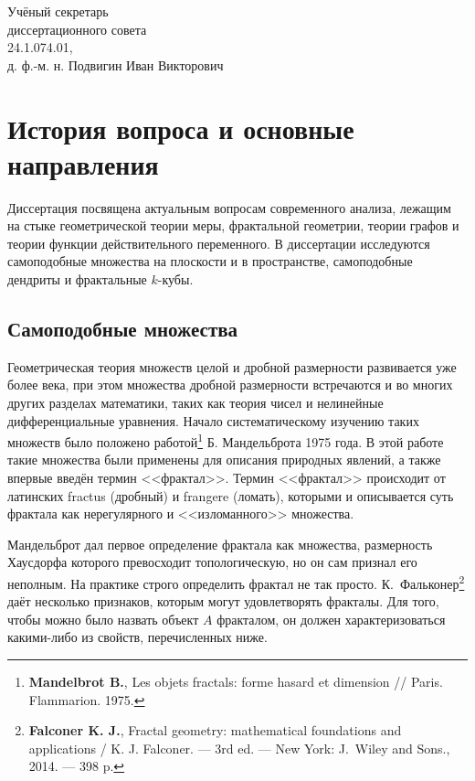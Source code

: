 \documentclass[a5paper,9pt,twoside]{extarticle} %
\begin{document}
\vspace{0.008\paperheight plus1fill}


\vspace{0.008\paperheight plus1fill}
\noindent
Учёный секретарь\\
диссертационного совета\\
24.1.074.01,\\
д. ф.-м. н. \hfill Подвигин Иван Викторович

\newpage

\section{История вопроса и основные направления}

Диссертация посвящена актуальным вопросам современного анализа, лежащим на стыке геометрической теории меры, фрактальной геометрии, теории графов и теории функции действительного переменного.
В диссертации исследуются самоподобные множества на плоскости и в пространстве, самоподобные дендриты и фрактальные $k$-кубы.

\subsection{Самоподобные множества}

Геометрическая теория множеств целой и дробной размерности развивается уже более века, при этом множества дробной размерности встречаются и во многих других разделах математики, таких как теория чисел и нелинейные дифференциальные уравнения.
Начало систематическому изучению таких множеств было положено работой\footnote{{\bf Mandelbrot B.}, Les objets fractals: forme hasard et dimension // Paris. Flammarion. 1975.} Б. Мандельброта 1975 года.
В этой работе такие множества были применены для описания природных явлений, а также впервые введён термин <<фрактал>>.
Термин <<фрактал>> происходит от латинских fractus (дробный) и frangere (ломать), которыми и описывается суть фрактала как нерегулярного и <<изломанного>> множества.

Мандельброт дал первое определение фрактала как множества, размерность Хаусдорфа которого превосходит топологическую, но он сам признал его неполным.
На практике строго определить фрактал не так просто.
К.~Фальконер\footnote{{\bf Falconer K. J.}, Fractal geometry: mathematical foundations and applications / K. J. Falconer. --- 3rd ed. --- New York: J.~Wiley and Sons., 2014. --- 398 p.} даёт несколько признаков, которым могут удовлетворять фракталы.
Для того, чтобы можно было назвать объект $A$ фракталом, он должен характеризоваться какими-либо из свойств, перечисленных ниже.
\end{document}
